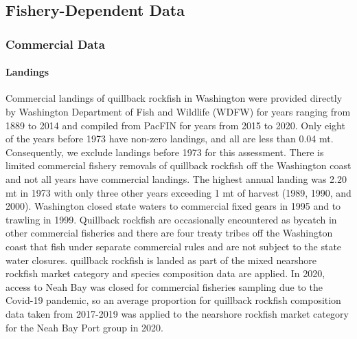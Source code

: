 \documentclass[11pt,
  english,
  a4paper,
]{article}
\begin{document}
\leavevmode\tagmcend\tagstructend\par


\hypertarget{fishery-dependent-data}{%
\subsection{Fishery-Dependent Data}\label{fishery-dependent-data}}

\leavevmode\tagmcend\tagstructend


\hypertarget{commercial-data}{%
\subsubsection{Commercial Data}\label{commercial-data}}

\leavevmode\tagmcend\tagstructend


\hypertarget{landings-1}{%
\paragraph{Landings}\label{landings-1}}

\leavevmode\tagmcend\tagstructend


Commercial landings of quillback rockfish in Washington were provided directly by Washington Department of Fish and Wildlife (WDFW) for years ranging from 1889 to 2014 and compiled from PacFIN for years from 2015 to 2020. Only eight of the years before 1973 have non-zero landings, and all are less than 0.04 mt. Consequently, we exclude landings before 1973 for this assessment. There is limited commercial fishery removals of quillback rockfish off the Washington coast and not all years have commercial landings. The highest annual landing was 2.20 mt in 1973 with only three other years exceeding 1 mt of harvest (1989, 1990, and 2000). Washington closed state waters to commercial fixed gears in 1995 and to trawling in 1999. Quillback rockfish are occasionally encountered as bycatch in other commercial fisheries and there are four treaty tribes off the Washington coast that fish under separate commercial rules and are not subject to the state water closures. quillback rockfish is landed as part of the mixed nearshore rockfish market category and species composition data are applied. In 2020, access to Neah Bay was closed for commercial fisheries sampling due to the Covid-19 pandemic, so an average proportion for quillback rockfish composition data taken from 2017-2019 was applied to the nearshore rockfish market category for the Neah Bay Port group in 2020.
\end{document}
